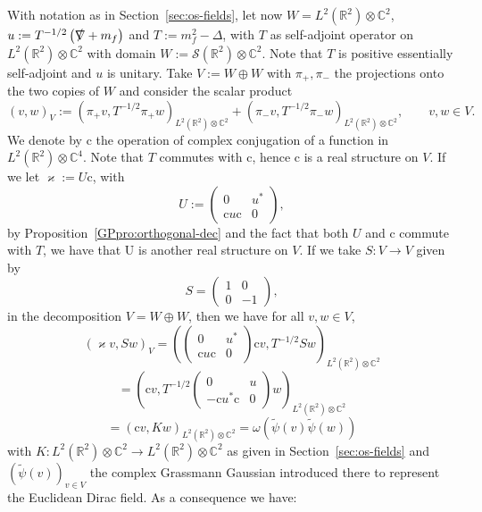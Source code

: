 \documentclass{article}
\newcommand{\assign}{:=}
\newcommand{\slashnabla}{\slashed{\nabla}}
\begin{document}
With notation as in Section~\ref{sec:os-fields}, let now $W = L^2
(\mathbb{R}^2) \otimes \mathbb{C}^2$, $u \assign T^{- 1 / 2} \left(
\slashnabla + m_f \right)$ and $T \assign m_f^2 - \Delta$, with $T$ as
self-adjoint operator on $L^2 (\mathbb{R}^2) \otimes \mathbb{C}^2$ with domain
$W \assign \mathcal{S} (\mathbb{R}^2) \otimes \mathbb{C}^2$. Note that $T$ is
positive essentially self-adjoint and $u$ is unitary. Take $V \assign W \oplus
W$ with $\pi_+, \pi_-$ the projections onto the two copies of $W$ and consider
the scalar product
\[ (v, w)_V \assign (\pi_+ v, T^{- 1 / 2} \pi_+ w)_{L^2 (\mathbb{R}^2) \otimes
   \mathbb{C}^2} + (\pi_- v, T^{- 1 / 2} \pi_- w)_{L^2 (\mathbb{R}^2) \otimes
   \mathbb{C}^2}, \qquad v, w \in V. \]
We denote by $\mathrm{c}$ the operation of complex conjugation of a function
in $L^2 (\mathbb{R}^2) \otimes \mathbb{C}^4$. Note that $T$ commutes with
$\mathrm{c}$, hence $\mathrm{c}$ is a real structure on $V$. If we let
$\varkappa \assign U\mathrm{c}$, with
\[ U \assign \left( \begin{array}{cc}
     0 & u^{\ast}\\
     \mathrm{c}u\mathrm{c} & 0
   \end{array} \right), \]
by Proposition~\ref{GPpro:orthogonal-dec} and the fact that both $U$ and
$\mathrm{c}$ commute with $T$, we have that $\mathrm{U}$ is another real
structure on $V$. If we take $S : V \rightarrow V$ given by
\begin{equation}
  S = \left(\begin{array}{cc}
    1 & 0\\
    0 & - 1
  \end{array}\right), \label{eq:S-diag}
\end{equation}
in the decomposition $V = W \oplus W$, then we have for all $v, w \in V$,
\[ (\varkappa v, S w)_V = \left( \left( \begin{array}{cc}
     0 & u^{\ast}\\
     \mathrm{c}u\mathrm{c} & 0
   \end{array} \right) \mathrm{c}v, T^{- 1 / 2} S w \right)_{L^2
   (\mathbb{R}^2) \otimes \mathbb{C}^2} \]
\[ = \left( \mathrm{c}v, T^{- 1 / 2} \left( \begin{array}{cc}
     0 & u\\
     -\mathrm{c}u^{\ast} \mathrm{c} & 0
   \end{array} \right) w \right)_{L^2 (\mathbb{R}^2) \otimes \mathbb{C}^2} \]
\[ = (\mathrm{c}v, K w)_{L^2 (\mathbb{R}^2) \otimes \mathbb{C}^2} = \omega
   (\tilde{\psi} (v) \tilde{\psi} (w)) \]
with $K : L^2 (\mathbb{R}^2) \otimes \mathbb{C}^2 \rightarrow L^2
(\mathbb{R}^2) \otimes \mathbb{C}^2$ as given in Section~\ref{sec:os-fields}
and $(\tilde{\psi} (v))_{v \in V}$ the complex Grassmann Gaussian introduced
there to represent the Euclidean Dirac field. As a consequence we have:
\end{document}
